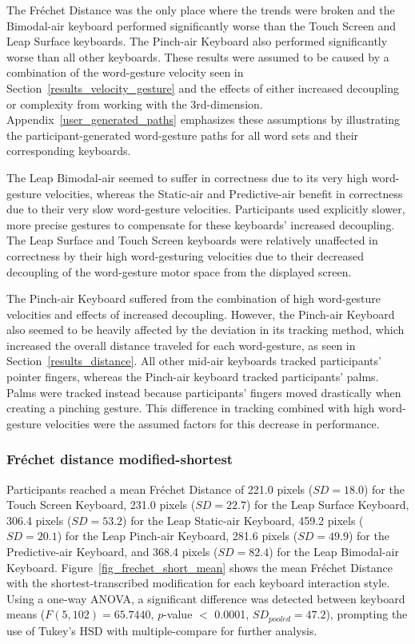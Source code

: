 The Fr\'echet Distance was the only place where the trends were broken and the Bimodal-air keyboard performed significantly worse than the Touch Screen and Leap Surface keyboards. The Pinch-air Keyboard also performed significantly worse than all other keyboards. These results were assumed to be caused by a combination of the word-gesture velocity seen in Section~\ref{results_velocity_gesture} and the effects of either increased decoupling or complexity from working with the 3rd-dimension. Appendix~\ref{user_generated_paths} emphasizes these assumptions by illustrating the participant-generated word-gesture paths for all word sets and their corresponding keyboards.

The Leap Bimodal-air seemed to suffer in correctness due to its very high word-gesture velocities, whereas the Static-air and Predictive-air benefit in correctness due to their very slow word-gesture velocities. Participants used explicitly slower, more precise gestures to compensate for these keyboards' increased decoupling. The Leap Surface and Touch Screen keyboards were relatively unaffected in correctness by their high word-gesturing velocities due to their decreased decoupling of the word-gesture motor space from the displayed screen.

The Pinch-air Keyboard suffered from the combination of high word-gesture velocities and effects of increased decoupling. However, the Pinch-air Keyboard also seemed to be heavily affected by the deviation in its tracking method, which increased the overall distance traveled for each word-gesture, as seen in Section~\ref{results_distance}. All other mid-air keyboards tracked participants' pointer fingers, whereas the Pinch-air keyboard tracked participants' palms. Palms were tracked instead because participants' fingers moved drastically when creating a pinching gesture. This difference in tracking combined with high word-gesture velocities were the assumed factors for this decrease in performance.

\subsubsection{Fr\'echet distance modified-shortest}
Participants reached a mean Fr\'echet Distance of 221.0 pixels ($SD = 18.0$) for the Touch Screen Keyboard, 231.0 pixels ($SD = 22.7$) for the Leap Surface Keyboard, 306.4 pixels ($SD = 53.2$) for the Leap Static-air Keyboard, 459.2 pixels ($SD = 20.1$) for the Leap Pinch-air Keyboard, 281.6 pixels ($SD = 49.9$) for the Predictive-air Keyboard, and 368.4 pixels ($SD = 82.4$) for the Leap Bimodal-air Keyboard. Figure~\ref{fig_frechet_short_mean} shows the mean Fr\'echet Distance with the shortest-transcribed modification for each keyboard interaction style. Using a one-way ANOVA, a significant difference was detected between keyboard means ($F(5, 102) = 65.7440$, $p$-value $<$ 0.0001, $SD_{pooled} = 47.2$), prompting the use of Tukey's HSD with multiple-compare for further analysis.

